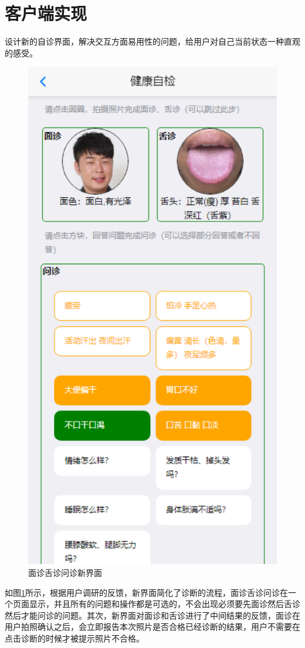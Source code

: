 \section{客户端实现}
设计新的自诊界面，解决交互方面易用性的问题，给用户对自己当前状态一种直观的感受。
\begin{figure}
    \centering
    \includegraphics{images/diag.png}
    \caption{面诊舌诊问诊新界面}
    \label{fig:diag_new}
\end{figure}
如图\ref{fig:diag_new}所示，根据用户调研的反馈，新界面简化了诊断的流程，面诊舌诊问诊在一个页面显示，并且所有的问题和操作都是可选的，不会出现必须要先面诊然后舌诊然后才能问诊的问题。其次，新界面对面诊和舌诊进行了中间结果的反馈，面诊在用户拍照确认之后，会立即报告本次照片是否合格已经诊断的结果，用户不需要在点击诊断的时候才被提示照片不合格。

